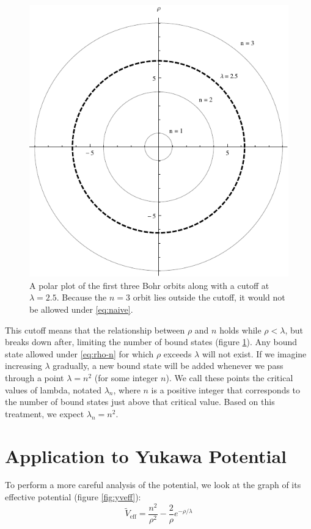\documentclass[12pt,twoside]{reedthesis}
\newcommand{\eqn}[1]{\begin{equation}#1\end{equation}}
\newcommand{\fig}[2]{\begin{figure}\begin{center}#1\end{center}#2\end{figure}}
\begin{document}
\fig{
\includegraphics{Figures/cutoff}}
{
\caption[Yukawa orbits with cutoff]{A polar plot of the first three Bohr orbits along with a cutoff at $\lambda = 2.5$. Because the $n=3$ orbit lies outside the cutoff, it would not be allowed under \eqref{eq:naive}.}
\label{fig:cutoff}
}

This cutoff means that the relationship between $\rho$ and $n$ holds while $\rho < \lambda$, but breaks down after, limiting the number of bound states (figure \ref{fig:cutoff}). Any bound state allowed under \eqref{eq:rho-n} for which $\rho$ exceeds $\lambda$ will not exist. If we imagine increasing $\lambda$ gradually, a new bound state will be added whenever we pass through a point $\lambda = n^2$ (for some integer $n$). We call these points the critical values of lambda, notated $\lambda_{n}$, where $n$ is a positive integer that corresponds to the number of bound states just above that critical value. Based on this treatment, we expect $\lambda_{n} = n^2$.

\section{Application to Yukawa Potential}
To perform a more careful analysis of the potential, we look at the graph of its effective potential (figure \ref{fig:yveff}):
\eqn{
\tilde{V}_{\mathrm{eff}} = \frac{n^2}{\rho^2} - \frac{2}{\rho}e^{-\rho/\lambda}
\label{eq:yveff}
}
 
\end{document}
